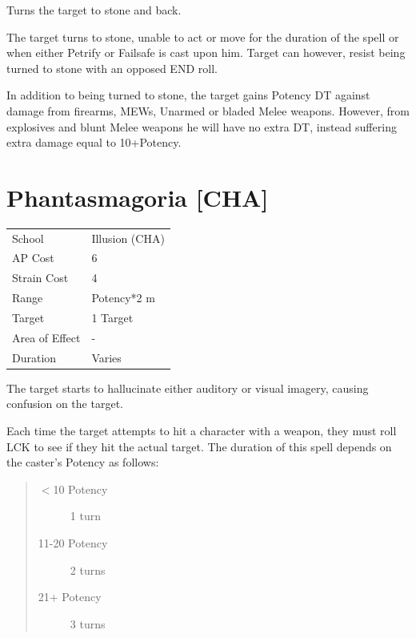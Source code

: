 \documentclass[11pt,a4paper,twocolumn]{book}
\begin{document}
\medskip

Turns the target to stone and back.

The target turns to stone, unable to act or move for the duration of the spell or when either Petrify or Failsafe is cast upon him. Target can however, resist being turned to stone with an opposed END roll.

In addition to being turned to stone, the target gains Potency DT against damage from firearms, MEWs, Unarmed or bladed Melee weapons. However, from explosives and blunt Melee weapons he will have no extra DT, instead suffering extra damage equal to 10+Potency.

\vfill


\section*{Phantasmagoria [CHA]}
{
	\begin{tabu} to 75mm{| X[l,4] | X[l,7] |}
		\hline
		School 			& Illusion (CHA) 		\\
        AP Cost	      	& 6 					\\
        Strain Cost     & 4 					\\
        Range     		& Potency*2	m			\\
        Target      	& 1 Target				\\
        Area of Effect  & -  	 				\\
        Duration     	& Varies				\\ \hline
	\end{tabu}
		
}

\medskip

The target starts to hallucinate either auditory or visual imagery, causing confusion on the target.

Each time the target attempts to hit a character with a weapon, they must roll LCK to see if they hit the actual target. The duration of this spell depends on the caster's Potency as follows:
\begin{quote}
  \begin{description}
    \item[$<$10 Potency] 	1 turn
    \item[11-20 Potency] 	2 turns
    \item[21+ Potency] 	3 turns
  \end{description}	
\end{quote}
\end{document}
